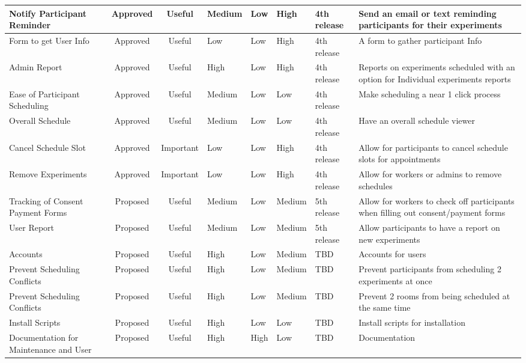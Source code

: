 \documentclass{article}
\begin{document}
\begin{table}[!hb]
\begin{tabular}{|p{2.5cm}|c|c|p{1.25cm}|p{1.5cm}|p{1.5cm}|p{1.25cm}|p{3.25cm}|}
        \hline
        Notify Participant Reminder & Approved & Useful & Medium & Low   & High  & 4th release  & Send an email or text reminding participants for their experiments \\
        \hline
        Form to get User Info & Approved & Useful & Low   & Low   & High  & 4th release  & A form to gather participant Info \\
        \hline
        Admin Report & Approved & Useful & High  & Low   & High  & 4th release  & Reports on experiments scheduled with an option for Individual experiments reports \\
        \hline
        Ease of Participant Scheduling & Approved & Useful & Medium & Low   & Low   & 4th release  & Make scheduling a near 1 click process \\
        \hline
        Overall Schedule & Approved & Useful & Medium & Low   & Low   & 4th release  & Have an overall schedule viewer \\
        \hline
        Cancel Schedule Slot & Approved & Important & Low   & Low   & High  & 4th release  & Allow for participants to cancel schedule slots for appointments \\
        \hline
        Remove Experiments & Approved & Important & Low   & Low   & High  & 4th release  & Allow for workers or admins to remove schedules \\
        \hline
        Tracking of Consent Payment Forms & Proposed & Useful & Medium & Low   & Medium & 5th release  & Allow for workers to check off participants when filling out consent/payment forms \\
        \hline
        User Report & Proposed & Useful & Medium & Low   & Medium & 5th release & Allow participants to have a report on new experiments \\
        \hline
        Accounts & Proposed & Useful & High  & Low   & Medium & TBD & Accounts for users \\
        \hline
        Prevent Scheduling Conflicts & Proposed & Useful & High  & Low   & Medium & TBD & Prevent participants from scheduling 2 experiments at once \\
        \hline
        Prevent Scheduling Conflicts & Proposed & Useful & High  & Low   & Medium & TBD  & Prevent 2 rooms from being scheduled at the same time \\
        \hline
        Install Scripts & Proposed & Useful & High  & Low   & Low   & TBD & Install scripts for installation \\
        \hline
        Documentation for Maintenance and User & Proposed & Useful & High  & High  & Low   & TBD  & Documentation \\
        \hline
    \end{tabular}
\end{table}
\end{document}
